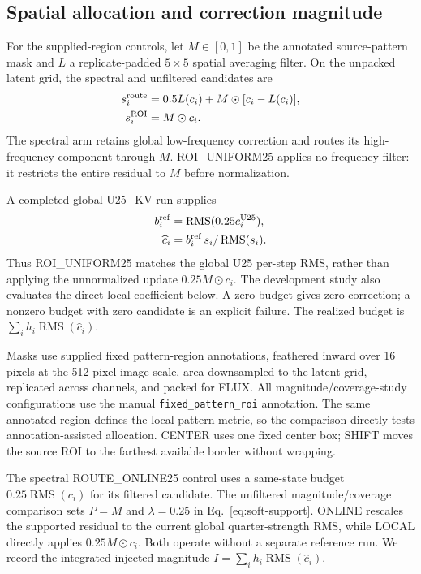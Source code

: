 \documentclass[conference]{IEEEtran}
\newcommand{\RMS}{\operatorname{RMS}}
\begin{document}
\subsection{Spatial allocation and correction magnitude}
For the supplied-region controls, let $M\in[0,1]$ be the annotated source-pattern mask and $L$ a replicate-padded $5\times5$ spatial averaging filter. On the unpacked latent grid, the spectral and unfiltered candidates are
\begin{equation}
\begin{aligned}
s_i^{\rm route}&=0.5L(c_i)+M\odot[c_i-L(c_i)],\\
s_i^{\rm ROI}&=M\odot c_i.
\end{aligned}
\label{eq:candidates}
\end{equation}
The spectral arm retains global low-frequency correction and routes its high-frequency component through $M$. ROI\_UNIFORM25 applies no frequency filter: it restricts the entire residual to $M$ before normalization.

A completed global U25\_KV run supplies
\begin{equation}
\begin{aligned}
b_i^{\rm ref}&=\RMS(0.25c_i^{\rm U25}),\\
\widehat c_i&=b_i^{\rm ref}\,s_i/\RMS(s_i).
\end{aligned}
\label{eq:normalization}
\end{equation}
Thus ROI\_UNIFORM25 matches the global U25 per-step RMS, rather than applying the unnormalized update $0.25M\odot c_i$. The development study also evaluates the direct local coefficient below. A zero budget gives zero correction; a nonzero budget with zero candidate is an explicit failure. The realized budget is $\sum_i h_i\RMS(\widehat c_i)$.

Masks use supplied fixed pattern-region annotations, feathered inward over 16 pixels at the 512-pixel image scale, area-downsampled to the latent grid, replicated across channels, and packed for FLUX. All magnitude/coverage-study configurations use the manual \texttt{fixed\_pattern\_roi} annotation. The same annotated region defines the local pattern metric, so the comparison directly tests annotation-assisted allocation. CENTER uses one fixed center box; SHIFT moves the source ROI to the farthest available border without wrapping.

The spectral ROUTE\_ONLINE25 control uses a same-state budget $0.25\RMS(c_i)$ for its filtered candidate. The unfiltered magnitude/coverage comparison sets $P=M$ and $\lambda=0.25$ in Eq.~\eqref{eq:soft-support}. ONLINE rescales the supported residual to the current global quarter-strength RMS, while LOCAL directly applies $0.25M\odot c_i$. Both operate without a separate reference run. We record the integrated injected magnitude $I=\sum_i h_i\RMS(\widehat c_i)$.
\end{document}
